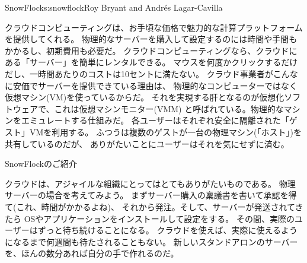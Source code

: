 \begin{aosachapter}{SnowFlock}{s:snowflock}{Roy Bryant and Andr\'e{s} Lagar-Cavilla}

クラウドコンピューティングは、お手頃な価格で魅力的な計算プラットフォームを提供してくれる。
物理的なサーバーを購入して設定するのには時間や手間もかかるし、初期費用も必要だ。
クラウドコンピューティングなら、クラウドにある「サーバー」を簡単にレンタルできる。
マウスを何度かクリックするだけだし、一時間あたりのコストは10セントに満たない。
クラウド事業者がこんなに安価でサーバーを提供できている理由は、
物理的なコンピューターではなく仮想マシン(VM)を使っているからだ。
それを実現する肝となるのが仮想化ソフトウェアで、これは仮想マシンモニター(VMM)
と呼ばれている。物理的なマシンをエミュレートする仕組みだ。
各ユーザーはそれぞれ安全に隔離された「ゲスト」VMを利用する。
ふつうは複数のゲストが一台の物理マシン(「ホスト」)を共有しているのだが、
ありがたいことにユーザーはそれを気にせずに済む。

\begin{aosasect1}{SnowFlockのご紹介}

クラウドは、アジャイルな組織にとってはとてもありがたいものである。
物理サーバーの場合を考えてみよう。
まずサーバー購入の稟議書を書いて承認を得て(これ、時間がかかるよね)、
それから発注。そして、サーバーが発送されてきたら
OSやアプリケーションをインストールして設定をする。
その間、実際のユーザーはずっと待ち続けることになる。
クラウドを使えば、実際に使えるようになるまで何週間も待たされることもない。
新しいスタンドアロンのサーバーを、ほんの数分あれば自分の手で作れるのだ。


\end{aosasect1}
\end{aosachapter}
